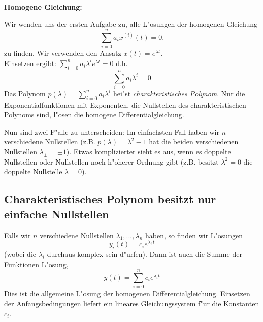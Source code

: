 {\bf Homogene Gleichung:}\par
Wir wenden uns der ersten Aufgabe zu, alle L"osungen der homogenen Gleichung 
$$ \sum_{i=0}^n a_i x^{(i)}(t)  =  0.$$
zu finden. Wir verwenden den Ansatz $ x(t) = e^{\lambda t}.$\\
Einsetzen ergibt: $ \sum_{i=0}^n a_i \lambda^i e^{\lambda t}=  0$
d.h.
$$ \sum_{i=0}^n a_i \lambda^i =  0$$
Das Polynom $p(\lambda) = \sum_{i=0}^n a_i \lambda^i $ hei"st \emph{charakteristisches Polynom}.  
Nur die Exponentialfunktionen mit 
Exponenten, die Nullstellen des charakteristischen Polynoms sind, l"osen die 
homogene Differentialgleichung. 

Nun sind zwei F"alle zu unterscheiden:
Im einfachsten Fall haben wir $n$ verschiedene Nullstellen (z.B. $p(\lambda) = \lambda^2-1$ hat
die beiden verschiedenen Nullstellen $\lambda_\pm = \pm 1$). Etwas komplizierter sieht es aus,
wenn es doppelte Nullstellen oder Nullstellen noch h"oherer Ordnung gibt (z.B. 
besitzt $\lambda^2=0$ die doppelte Nullstelle $\lambda=0$).

\subsection{Charakteristisches Polynom besitzt nur einfache Nullstellen}
Falls wir $n$ verschiedene Nullstellen $\lambda_1,...,\lambda_n$ haben, so finden wir L"osungen
$$ y_i(t) = c_i e^{\lambda_i\, t}$$
(wobei die $\lambda_i$ durchaus komplex sein d"urfen). Dann ist auch die Summe 
der Funktionen L"osung,
$$ y(t) = \sum_{i=0}^n c_i e^{\lambda_i t}$$
Dies ist die allgemeine L"osung der homogenen Differentialgleichung.
Einsetzen der Anfangsbedingungen liefert ein lineares Gleichungssystem 
f"ur die Konstanten $c_i$.

\begin{auf}\cha\label{block3A1}

\end{auf}
